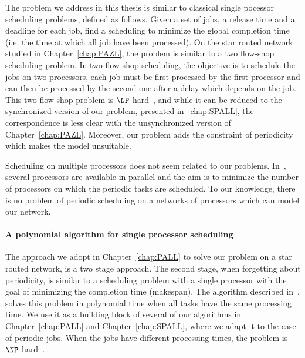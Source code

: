 The problem we address in this thesis is similar to classical single pocessor scheduling problems, defined as follows. Given a set of jobs, a release time and a deadline for each job, find a scheduling to minimize the global completion time (i.e. the time at which all job have been processed). On the star routed network studied in Chapter~\ref{chap:PAZL}, the problem is similar to a two flow-shop scheduling problem. In two flow-shop scheduling, the objective is to schedule the jobs on two processors, each job must be first processed by the first processor and can then 
be processed by the second one after a delay which depends on the job. This two-flow shop problem is $\NP$-hard~\cite{yu2004minimizing}, and while it can be reduced to the synchronized version of our problem, presented in~\ref{chap:SPALL}, the correspondence is less clear with the unsynchronized version of Chapter~\ref{chap:PAZL}. Moreover, our problem adds the constraint of periodicity which makes the model unsuitable.

Scheduling on multiple processors does not seem related to our problems. In~\cite{korst1991periodic,hanen1993cyclic,aupy2017periodic}, several processors are available in parallel and the aim is to minimize the number of processors on which the periodic tasks are scheduled. To our knowledge, there is no problem of periodic scheduling on a networks of processors which can model our network. 


\paragraph{A polynomial algorithm for single processor scheduling}

The approach we adopt in Chapter~\ref{chap:PALL} to solve our problem on a star routed network, is a two stage approach. The second stage,
when forgetting about periodicity, is similar to a scheduling problem with a single processor with the goal of minimizing the completion time (makespan). The algorithm described in~\cite{simons1978fast}, solves this problem in polynomial time when all tasks have the same processing time. We use it as a building block of several of our algorithms in Chapter~\ref{chap:PALL} and
Chapter~\ref{chap:SPALL}, where we adapt it to the case of periodic jobs. When the jobs have different processing times, the problem
is $\NP$-hard~\cite{lenstra1977complexity}.




